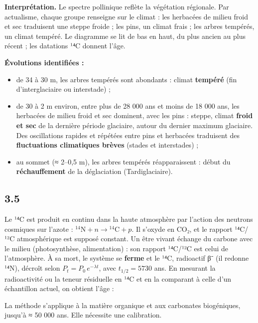 \documentclass[11pt,a4paper]{article}
\providecommand{\tightlist}{\setlength{\itemsep}{0pt}\setlength{\parskip}{0pt}}
\newcommand{\equationajustee}[1]{%
  \sbox{\boiteequation}{$\displaystyle #1$}%
  \ifdim\wd\boiteequation>\linewidth
    \[\resizebox{\linewidth}{!}{\usebox{\boiteequation}}\]%
  \else
    \[#1\]%
  \fi}
\begin{document}
\textbf{Interprétation.} Le spectre pollinique reflète la végétation régionale. Par actualisme, chaque groupe renseigne sur le climat : les herbacées de milieu froid et sec traduisent une steppe froide ; les pins, un climat frais ; les arbres tempérés, un climat tempéré. Le diagramme se lit de bas en haut, du plus ancien au plus récent ; les datations ¹⁴C donnent l'âge.

\textbf{Évolutions identifiées :}

\begin{itemize}
\tightlist
\item
  de 34 à 30 m, les arbres tempérés sont abondants : climat \textbf{tempéré} (fin d'interglaciaire ou interstade) ;
\item
  de 30 à 2 m environ, entre plus de 28 000 ans et moins de 18 000 ans, les herbacées de milieu froid et sec dominent, avec les pins : steppe, climat \textbf{froid et sec} de la dernière période glaciaire, autour du dernier maximum glaciaire. Des oscillations rapides et répétées entre pins et herbacées traduisent des \textbf{fluctuations climatiques brèves} (stades et interstades) ;
\item
  au sommet (≈ 2--0,5 m), les arbres tempérés réapparaissent : début du \textbf{réchauffement} de la déglaciation (Tardiglaciaire).
\end{itemize}

\hypertarget{section-32}{%
\subsection{3.5}\label{section-32}}

Le ¹⁴C est produit en continu dans la haute atmosphère par l'action des neutrons cosmiques sur l'azote : \(^{14}\mathrm{N} + n \rightarrow {}^{14}\mathrm{C} + p\). Il s'oxyde en CO₂, et le rapport ¹⁴C/¹²C atmosphérique est supposé constant. Un être vivant échange du carbone avec le milieu (photosynthèse, alimentation) : son rapport ¹⁴C/¹²C est celui de l'atmosphère. À sa mort, le système se \textbf{ferme} et le ¹⁴C, radioactif β⁻ (il redonne ¹⁴N), décroît selon \(P_t = P_0\,e^{-\lambda t}\), avec \(t_{1/2} = 5730\) ans. En mesurant la radioactivité ou la teneur résiduelle en ¹⁴C et en la comparant à celle d'un échantillon actuel, on obtient l'âge :

\equationajustee{t = -\frac{1}{\lambda}\ln\frac{P_t}{P_0}}

La méthode s'applique à la matière organique et aux carbonates biogéniques, jusqu'à ≈ 50 000 ans. Elle nécessite une calibration.
\end{document}
